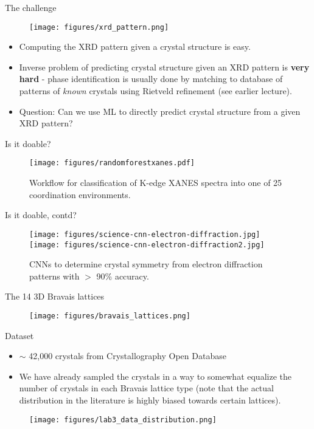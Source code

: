\documentclass[aspectratio=169]{beamer}
\begin{document}
\begin{frame}{The challenge}
\begin{figure}
    \centering
    \texttt{[image: figures/xrd\_pattern.png]}
\end{figure}
    \begin{itemize}
        \item Computing the XRD pattern given a crystal structure is easy.
        \item Inverse problem of predicting crystal structure given an XRD pattern is \textbf{very hard} - phase identification is usually done by matching to database of patterns of \textit{known} crystals using Rietveld refinement (see earlier lecture).
        \item Question: Can we use ML to directly predict crystal structure from a given XRD pattern?
    \end{itemize}
\end{frame}


\begin{frame}{Is it doable?}
\begin{figure}
    \centering
    \texttt{[image: figures/randomforestxanes.pdf]}
    \caption{Workflow for classification of K-edge XANES spectra into one of 25 coordination environments.\cite{zhengRandomForestModels2020}}
\end{figure}
\end{frame}


\begin{frame}{Is it doable, contd?}
\begin{figure}
    \centering
    \texttt{[image: figures/science-cnn-electron-diffraction.jpg]}
    \texttt{[image: figures/science-cnn-electron-diffraction2.jpg]}
    \caption{CNNs to determine crystal symmetry from electron diffraction patterns with $>$ 90\% accuracy.\cite{kaufmannCrystalSymmetryDetermination2020}}
\end{figure}
\end{frame}


\begin{frame}{The 14 3D Bravais lattices}
\begin{figure}
    \texttt{[image: figures/bravais\_lattices.png]}
\end{figure}
\end{frame}


\begin{frame}{Dataset}
    \begin{itemize}
        \item $\sim$ 42,000 crystals from Crystallography Open Database
        \item We have already sampled the crystals in a way to somewhat equalize the number of crystals in each Bravais lattice type (note that the actual distribution in the literature is highly biased towards certain lattices).  
    \end{itemize}
    \begin{figure}
        \centering
        \texttt{[image: figures/lab3\_data\_distribution.png]}
    \end{figure}
\end{frame}
\end{document}
